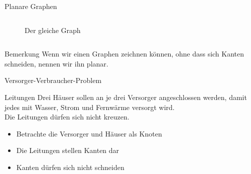 \documentclass[18pt]{beamer}
\begin{document}
\begin{frame}{Planare Graphen}
\begin{columns}
\begin{column}{0.5\textwidth}
\begin{figure}[h]
                    \caption{Der gleiche Graph}
                \end{figure}
            \end{column}
        \end{columns}
        \pause
        \begin{block}{Bemerkung}
            Wenn wir einen Graphen zeichnen können, 
            ohne dass sich Kanten schneiden, 
            nennen wir ihn planar.
        \end{block}
    \end{frame}

    \begin{frame}{Versorger-Verbraucher-Problem}
        \begin{block}{Leitungen}
            Drei Häuser sollen an je drei Versorger angeschlossen werden,
            damit jedes mit Wasser, Strom und Fernwärme versorgt wird.\\
            Die Leitungen dürfen sich nicht kreuzen.
        \end{block}
        \pause
        \begin{itemize}
            \item Betrachte die Versorger und Häuser als Knoten
            \item Die Leitungen stellen Kanten dar
            \item Kanten dürfen sich nicht schneiden
        \end{itemize}
    \end{frame}
\end{document}
